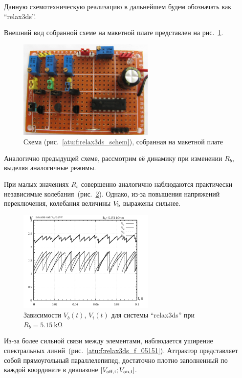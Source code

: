 Данную схемотехническую реализацию в дальнейшем будем обозначать как ``relax3ds''.

Внешний вид собранной схеме на макетной плате представлен на рис.~\ref{atu:f:relax3ds_board}.

\begin{figure}[htb!]
  \centerline{\includegraphics[width=0.6\textwidth]{p/relax3ds_board.jpg} }
  \caption{Схема (рис.~\ref{atu:f:relax3ds_schem}), собранная на макетной плате}
  \label{atu:f:relax3ds_board}
\end{figure}

Аналогично предыдущей схеме, рассмотрим её динамику при
изменении $R_b$, выделяя аналогичные режимы.


При малых
значениях $R_b$
совершенно аналогично наблюдаются практически независимые
колебания~(рис.~\ref{atu:f:relax3ds_t_05151}).
Однако, из-за повышения напряжений переключения,
колебания величины $V_\mathrm{b}$
выражены сильнее.

\begin{figure}[htb!]
  \centerline{\includegraphics[width=0.6\textwidth]{p/relax3ds_t_005151.png} }
  \caption{Зависимости $V_b(t)$, $V_i(t)$ для системы ``relax3ds'' при $R_b=\SI{5.15}{\kilo\ohm}$ }
  \label{atu:f:relax3ds_t_05151}
\end{figure}


Из-за более сильной связи между элементами,
наблюдается уширение спектральных линий~(рис.~\ref{atu:f:relax3ds_f_05151}).
Аттрактор представляет собой прямоугольный параллелепипед, достаточно плотно заполненный по каждой координате в
диапазоне $[ V_\mathrm{off,i} ; V_\mathrm{on,i} ] $.



